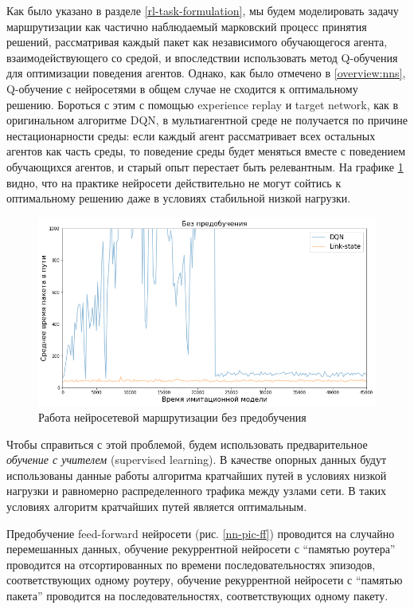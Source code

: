 \documentclass[specification, annotation]{itmo-student-thesis}
\begin{document}
Как было указано в разделе \ref{rl-task-formulation}, мы будем моделировать
задачу маршрутизации как частично наблюдаемый марковский процесс принятия
решений, рассматривая каждый пакет как независимого обучающегося агента,
взаимодействующего со средой, и впоследствии использовать метод Q-обучения для
оптимизации поведения агентов. Однако, как было отмечено в \ref{overview:nns},
Q-обучение с нейросетями в общем случае не сходится к оптимальному решению.
Бороться с этим с помощью experience replay и target network, как в оригинальном
алгоритме DQN, в мультиагентной среде не получается по причине
нестационарности среды: если каждый агент рассматривает всех остальных агентов
как часть среды, то поведение среды будет меняться вместе с поведением
обучающихся агентов, и старый опыт перестает быть релевантным. На графике
\ref{non-convergence} видно, что на практике нейросети действительно не могут
сойтись к оптимальному решению даже в условиях стабильной низкой нагрузки.

\begin{figure}[!h]
  \caption{Работа нейросетевой маршрутизации без
    предобучения}\label{non-convergence}
  \centering
  \includegraphics[scale=0.6]{non-convergence}
\end{figure}

Чтобы справиться с этой проблемой, будем использовать предварительное
\textit{обучение с учителем} (supervised learning). В качестве опорных данных
будут использованы данные работы алгоритма кратчайших путей в условиях низкой
нагрузки и равномерно распределенного трафика между узлами сети. В таких
условиях алгоритм кратчайших путей является оптимальным.

Предобучение feed-forward нейросети (рис. \ref{nn-pic-ff}) проводится на случайно
перемешанных данных, обучение рекуррентной нейросети с \enquote{памятью роутера}
проводится на отсортированных по времени последовательностях эпизодов,
соответствующих одному роутеру, обучение рекуррентной нейросети с \enquote{памятью
пакета} проводится на последовательностях, соответствующих одному пакету.
\end{document}
